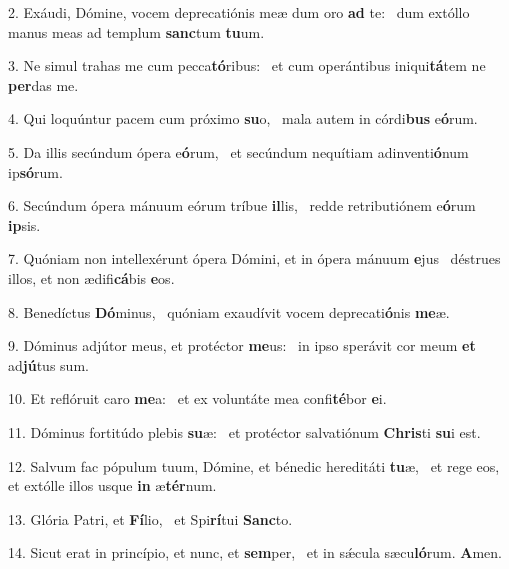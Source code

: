 2. Exáudi, Dómine, vocem deprecatiónis meæ dum oro \textbf{ad} te: \ast\  dum extóllo manus meas ad templum \textbf{sanc}tum \textbf{tu}um.\

3. Ne simul trahas me cum pecca\textbf{tó}ribus: \ast\  et cum operántibus iniqui\textbf{tá}tem ne \textbf{per}das me.\

4. Qui loquúntur pacem cum próximo \textbf{su}o, \ast\  mala autem in córdi\textbf{bus} e\textbf{ó}rum.\

5. Da illis secúndum ópera e\textbf{ó}rum, \ast\  et secúndum nequítiam adinventi\textbf{ó}num ip\textbf{só}rum.\

6. Secúndum ópera mánuum eórum tríbue \textbf{il}lis, \ast\  redde retributiónem e\textbf{ó}rum \textbf{ip}sis.\

7. Quóniam non intellexérunt ópera Dómini, et in ópera mánuum \textbf{e}jus \ast\  déstrues illos, et non ædifi\textbf{cá}bis \textbf{e}os.\

8. Benedíctus \textbf{Dó}minus, \ast\  quóniam exaudívit vocem deprecati\textbf{ó}nis \textbf{me}æ.\

9. Dóminus adjútor meus, et protéctor \textbf{me}us: \ast\  in ipso sperávit cor meum \textbf{et} ad\textbf{jú}tus sum.\

10. Et reflóruit caro \textbf{me}a: \ast\  et ex voluntáte mea confi\textbf{té}bor \textbf{e}i.\

11. Dóminus fortitúdo plebis \textbf{su}æ: \ast\  et protéctor salvatiónum \textbf{Chris}ti \textbf{su}i est.\

12. Salvum fac pópulum tuum, Dómine, et bénedic hereditáti \textbf{tu}æ, \ast\  et rege eos, et extólle illos usque \textbf{in} æ\textbf{tér}num.\

13. Glória Patri, et \textbf{Fí}lio, \ast\  et Spi\textbf{rí}tui \textbf{Sanc}to.\

14. Sicut erat in princípio, et nunc, et \textbf{sem}per, \ast\  et in sǽcula sæcu\textbf{ló}rum. \textbf{A}men.\

